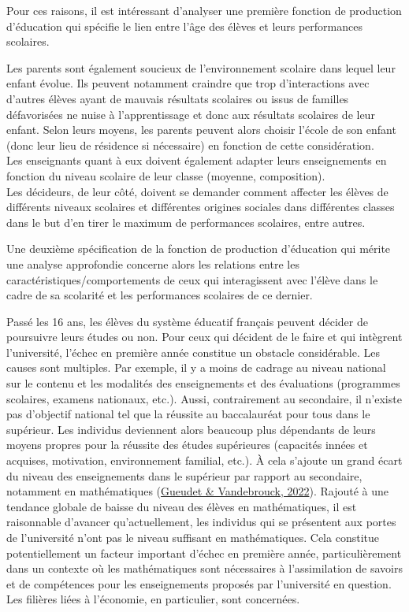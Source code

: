 \documentclass[
]{book}
\begin{document}
Pour ces raisons, il est intéressant d'analyser une première fonction de production d'éducation qui spécifie le lien entre l'âge des élèves et leurs performances scolaires.

\quad Les parents sont également soucieux de l'environnement scolaire dans lequel leur enfant évolue. Ils peuvent notamment craindre que trop d'interactions avec d'autres élèves ayant de mauvais résultats scolaires ou issus de familles défavorisées ne nuise à l'apprentissage et donc aux résultats scolaires de leur enfant. Selon leurs moyens, les parents peuvent alors choisir l'école de son enfant (donc leur lieu de résidence si nécessaire) en fonction de cette considération. \\
Les enseignants quant à eux doivent également adapter leurs enseignements en fonction du niveau scolaire de leur classe (moyenne, composition).\\
Les décideurs, de leur côté, doivent se demander comment affecter les élèves de différents niveaux scolaires et différentes origines sociales dans différentes classes dans le but d'en tirer le maximum de performances scolaires, entre autres.

Une deuxième spécification de la fonction de production d'éducation qui mérite une analyse approfondie concerne alors les relations entre les caractéristiques/comportements de ceux qui interagissent avec l'élève dans le cadre de sa scolarité et les performances scolaires de ce dernier.

\quad Passé les 16 ans, les élèves du système éducatif français peuvent décider de poursuivre leurs études ou non. Pour ceux qui décident de le faire et qui intègrent l'université, l'échec en première année constitue un obstacle considérable. Les causes sont multiples. Par exemple, il y a moins de cadrage au niveau national sur le contenu et les modalités des enseignements et des évaluations (programmes scolaires, examens nationaux, etc.). Aussi, contrairement au secondaire, il n'existe pas d'objectif national tel que la réussite au baccalauréat pour tous dans le supérieur. Les individus deviennent alors beaucoup plus dépendants de leurs moyens propres pour la réussite des études supérieures (capacités innées et acquises, motivation, environnement familial, etc.). À cela s'ajoute un grand écart du niveau des enseignements dans le supérieur par rapport au secondaire, notamment en mathématiques (\protect\hyperlink{ref-GUE:VAN:22}{Gueudet \& Vandebrouck, 2022}). Rajouté à une tendance globale de baisse du niveau des élèves en mathématiques, il est raisonnable d'avancer qu'actuellement, les individus qui se présentent aux portes de l'université n'ont pas le niveau suffisant en mathématiques. Cela constitue potentiellement un facteur important d'échec en première année, particulièrement dans un contexte où les mathématiques sont nécessaires à l'assimilation de savoirs et de compétences pour les enseignements proposés par l'université en question. Les filières liées à l'économie, en particulier, sont concernées.
\end{document}
